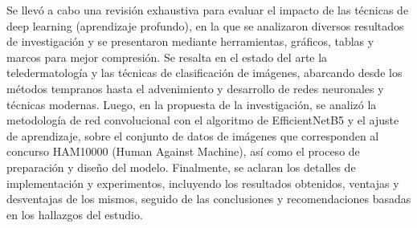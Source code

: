 
    Se llevó a cabo una revisión exhaustiva para evaluar el impacto de las técnicas de deep learning (aprendizaje profundo), 
    en la que se analizaron diversos resultados de investigación y se presentaron mediante herramientas, gráficos, tablas y marcos para mejor compresión. Se resalta en el estado del arte la teledermatología y las técnicas de clasificación de imágenes, abarcando desde los métodos tempranos hasta el advenimiento y desarrollo de redes neuronales y técnicas modernas. Luego, en la propuesta de la investigación, se analizó la metodología de red convolucional con el algoritmo de EfficientNetB5 y el ajuste de aprendizaje, sobre el conjunto de datos de imágenes que corresponden al concurso HAM10000 (Human Against Machine), así como el proceso de preparación y diseño del modelo. Finalmente, se aclaran los detalles de implementación y experimentos, incluyendo los resultados obtenidos, ventajas y desventajas de los mismos, seguido de las conclusiones y recomendaciones basadas en los hallazgos del estudio.


